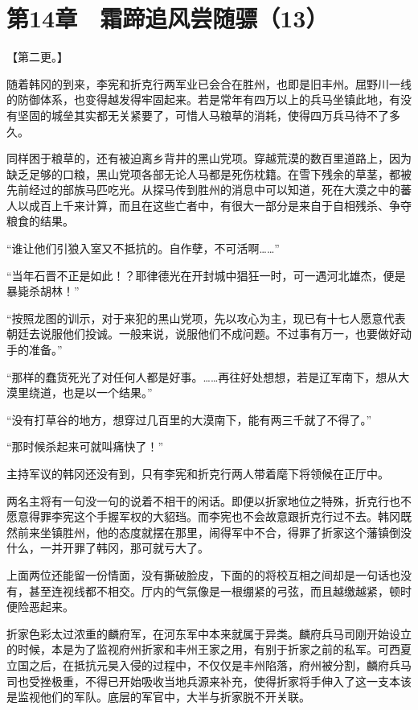 \section{第14章　霜蹄追风尝随骠（13）}

【第二更。】

随着韩冈的到来，李宪和折克行两军业已会合在胜州，也即是旧丰州。屈野川一线的防御体系，也变得越发得牢固起来。若是常年有四万以上的兵马坐镇此地，有没有坚固的城垒其实都无关紧要了，可惜人马粮草的消耗，使得四万兵马待不了多久。

同样困于粮草的，还有被迫离乡背井的黑山党项。穿越荒漠的数百里道路上，因为缺乏足够的口粮，黑山党项各部无论人马都是死伤枕籍。在雪下残余的草茎，都被先前经过的部族马匹吃光。从探马传到胜州的消息中可以知道，死在大漠之中的蕃人以成百上千来计算，而且在这些亡者中，有很大一部分是来自于自相残杀、争夺粮食的结果。

“谁让他们引狼入室又不抵抗的。自作孽，不可活啊……”

“当年石晋不正是如此！？耶律德光在开封城中猖狂一时，可一遇河北雄杰，便是暴毙杀胡林！”

“按照龙图的训示，对于来犯的黑山党项，先以攻心为主，现已有十七人愿意代表朝廷去说服他们投诚。一般来说，说服他们不成问题。不过事有万一，也要做好动手的准备。”

“那样的蠢货死光了对任何人都是好事。……再往好处想想，若是辽军南下，想从大漠里绕道，也是以一个结果。”

“没有打草谷的地方，想穿过几百里的大漠南下，能有两三千就了不得了。”

“那时候杀起来可就叫痛快了！”

主持军议的韩冈还没有到，只有李宪和折克行两人带着麾下将领候在正厅中。

两名主将有一句没一句的说着不相干的闲话。即便以折家地位之特殊，折克行也不愿意得罪李宪这个手握军权的大貂珰。而李宪也不会故意跟折克行过不去。韩冈既然前来坐镇胜州，他的态度就摆在那里，闹得军中不合，得罪了折家这个藩镇倒没什么，一并开罪了韩冈，那可就亏大了。

上面两位还能留一份情面，没有撕破脸皮，下面的的将校互相之间却是一句话也没有，甚至连视线都不相交。厅内的气氛像是一根绷紧的弓弦，而且越缴越紧，顿时便险恶起来。

折家色彩太过浓重的麟府军，在河东军中本来就属于异类。麟府兵马司刚开始设立的时候，本是为了监视府州折家和丰州王家之用，有别于折家之前的私军。可西夏立国之后，在抵抗元昊入侵的过程中，不仅仅是丰州陷落，府州被分割，麟府兵马司也受挫极重，不得已开始吸收当地兵源来补充，使得折家将手伸入了这一支本该是监视他们的军队。底层的军官中，大半与折家脱不开关联。

